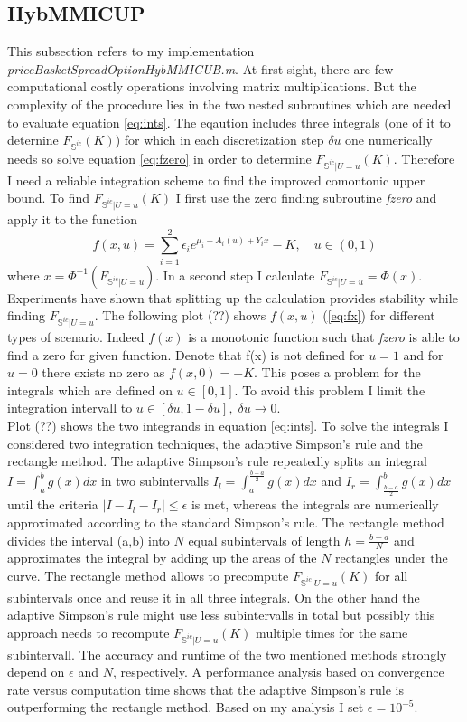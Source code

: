 \documentclass[a4paper]{article}
\begin{document}
\subsection{HybMMICUP}
This subsection refers to my implementation \emph{priceBasketSpreadOptionHybMMICUB.m}. At first sight, there are few computational costly operations involving matrix multiplications. But the complexity of the procedure lies in the two nested subroutines which are needed to evaluate equation \ref{eq:ints}. The eqaution includes three integrals (one of it to deternine $F_{\mathbb{S}^{ic}}(K)$) for which in each discretization step $\delta u$ one numerically needs so solve equation \ref{eq:fzero} in order to determine $F_{\mathbb{S}^{ic}|U=u}(K)$. Therefore I need a reliable integration scheme to find the improved comontonic upper bound. To find $F_{\mathbb{S}^{ic}|U=u}(K)$ I first use the zero finding subroutine \textit{fzero} and apply it to the function
\begin{equation}
\label{eq:fx}
f(x,u) = \sum_{i=1}^2\epsilon_ie^{\mu_i+A_i(u)+Y_ix}-K, \quad u\in(0,1)
\end{equation}
where $x = \Phi^{-1}(F_{\mathbb{S}^{ic}|U=u})$. In a second step I calculate $F_{\mathbb{S}^{ic}|U=u}=\Phi(x)$. Experiments have shown that splitting up the calculation provides stability while finding $F_{\mathbb{S}^{ic}|U=u}$. 
The following plot (??) shows $f(x,u)$ (\ref{eq:fx}) for different types of scenario. Indeed $f(x)$ is a monotonic function such that \textit{fzero} is able to find a zero for given function. Denote that f(x) is not defined for $u=1$ and for $u=0$ there exists no zero as $f(x,0)=-K$. This poses a problem for the integrals which are defined on $u\in[0,1]$. To avoid this problem I limit the integration intervall to $u\in[\delta u,1-\delta u],\; \delta u \rightarrow 0.$\\
Plot (??) shows the two integrands in equation \ref{eq:ints}. 
To solve the integrals I considered two integration techniques, the adaptive Simpson's rule and the rectangle method. The adaptive Simpson's rule repeatedly splits an integral $I = \int_a^b g(x) dx$ in two subintervalls $ I_l = \int_a^{\frac{b-a}{2}} g(x) dx$ and $I_r = \int_{\frac{b-a}{2}}^b g(x) dx$ until the criteria $|I-I_l-I_r| \leq \epsilon$ is met, whereas the integrals are numerically approximated according to the standard Simpson's rule. The rectangle method divides the interval (a,b) into $N$ equal subintervals of length $h=\frac{b-a}{N}$ and approximates the integral by adding up the areas of the $N$ rectangles under the curve. The rectangle method allows to precompute $F_{\mathbb{S}^{ic}|U=u}(K)$ for all subintervals once and reuse it in all three integrals. On the other hand the adaptive Simpson's rule might use less subintervalls in total but possibly this approach needs to recompute $F_{\mathbb{S}^{ic}|U=u}(K)$ multiple times for the same subintervall. The accuracy and runtime of the two mentioned methods strongly depend on $\epsilon$ and $N$, respectively. A performance analysis based on convergence rate versus computation time shows that the adaptive Simpson's rule is outperforming the rectangle method. Based on my analysis I set $\epsilon = 10^{-5}$. 
\end{document}
